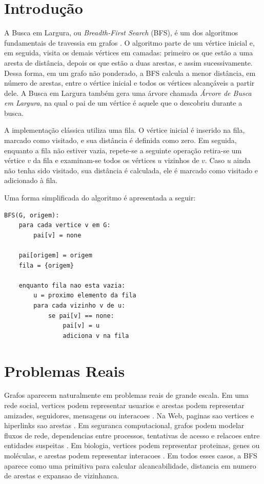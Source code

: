 \documentclass{article}
\begin{document}
\section{Introdução}
A Busca em Largura, ou \textit{Breadth-First Search} (BFS), é um dos algoritmos fundamentais de travessia em grafos \cite{cormenalgorithms}. O algoritmo parte de um vértice inicial e, em seguida, visita os demais vértices em camadas: primeiro os que estão a uma aresta de distância, depois os que estão a duas arestas, e assim sucessivamente. Dessa forma, em um grafo não ponderado, a BFS calcula a menor distância, em número de arestas, entre o vértice inicial e todos os vértices alcançáveis a partir dele. A Busca em Largura também gera uma árvore chamada \textit{Árvore de Busca em Largura}, na qual o pai de um vértice é aquele que o descobriu durante a busca.

A implementação clássica utiliza uma fila. O vértice inicial é inserido na fila, marcado como visitado, e sua distância é definida como zero. Em seguida, enquanto a fila não estiver vazia, repete-se a seguinte operação retira-se um vértice $v$ da fila e examinam-se todos os vértices $u$ vizinhos de $v$. Caso $u$ ainda não tenha sido visitado, sua distância é calculada, ele é marcado como visitado e adicionado à fila.

Uma forma simplificada do algoritmo é apresentada a seguir:

\begin{lstlisting}
BFS(G, origem):
	para cada vertice v em G:
        pai[v] = none

    pai[origem] = origem
    fila = {origem}

    enquanto fila nao esta vazia:
		u = proximo elemento da fila
		para cada vizinho v de u:
			se pai[v] == none:
				pai[v] = u
				adiciona v na fila
\end{lstlisting}

\section{Problemas Reais}

Grafos aparecem naturalmente em problemas reais de grande escala. Em uma rede
social, vertices podem representar usuarios e arestas podem representar
amizades, seguidores, mensagens ou interacoes \cite{easleykleinberg}. Na Web,
paginas sao vertices e hiperlinks sao arestas \cite{brinpage}. Em seguranca
computacional, grafos podem modelar fluxos de rede, dependencias entre
processos, tentativas de acesso e relacoes entre entidades suspeitas
\cite{akoglugraphanomaly}. Em biologia, vertices podem representar proteinas,
genes ou moléculas, e arestas podem representar interacoes
\cite{barabasinetworkbiology}. Em todos esses casos, a BFS aparece como uma
primitiva para calcular alcancabilidade, distancia em numero de arestas e
expansao de vizinhanca.
\end{document}
